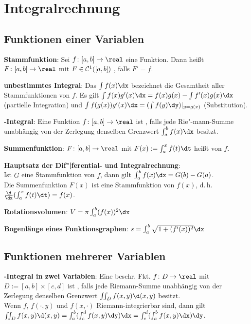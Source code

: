 \chapter{%
    Integralrechnung%
}

\section{%
    Funktionen einer Variablen%
}

\textbf{Stammfunktion}:
Sei $f\colon [a, b] \to \real$ eine Funktion.
Dann heißt $F\colon [a, b] \to \real$ mit $F \in \mathcal{C}^1([a, b])$ ,
falls $F' = f$.

\textbf{unbestimmtes Integral}:
Das  $\int f(x) \dx$ bezeichnet die Gesamtheit aller
Stammfunktionen von $f$.
Es gilt $\int f(x) g'(x) \dx = f(x) g(x) - \int f'(x) g(x) \dx$ (partielle Integration) und
$\int f(g(x)) g'(x) \dx = (\int f(y) \dy)|_{y = g(x)}$ (Substitution).

\linie

\textbf{-Integral}:
Eine Funktion $f\colon [a, b] \to \real$ ist ,
falls jede Rie"-mann-Summe unabhängig von der Zerlegung denselben Grenzwert
$\int_a^b f(x) \dx$ besitzt.

\linie

\textbf{Summenfunktion}:
$F\colon [a, b] \to \real$ mit $F(x) := \int_a^x f(t) \dt$ heißt  von $f$.

\textbf{Hauptsatz der Dif"|ferential- und Integralrechnung}:\\
Ist $G$ eine Stammfunktion von $f$, dann gilt $\int_a^b f(x) \dx = G(b) - G(a)$.\\
Die Summenfunktion $F(x)$ ist eine Stammfunktion von $f(x)$,
d.\,h. $\frac{\d}{\dx} (\int_a^x f(t) \dt) = f(x)$.

\linie

\textbf{Rotationsvolumen}:
$V = \pi \int_a^b (f(x))^2 \dx$

\textbf{Bogenlänge eines Funktionsgraphen}:
$s = \int_a^b \sqrt{1 + (f'(x))^2} \dx$

\section{%
    Funktionen mehrerer Variablen%
}

\textbf{-Integral in zwei Variablen}:
Eine beschr. Fkt. $f\colon D \to \real$ mit $D := [a, b] \times [c, d]$
ist , falls
jede Riemann-Summe unabhängig von der Zerlegung denselben Grenzwert
$\iint_D f(x, y) \d(x,y)$ besitzt.\\
Wenn $f$, $f(\cdot, y)$ und $f(x, \cdot)$ Riemann-integrierbar sind, dann gilt\\
$\iint_D f(x, y) \d(x,y) = \int_a^b (\int_c^d f(x, y) \dy) \dx
= \int_c^d (\int_a^b f(x, y) \dx) \dy$.

